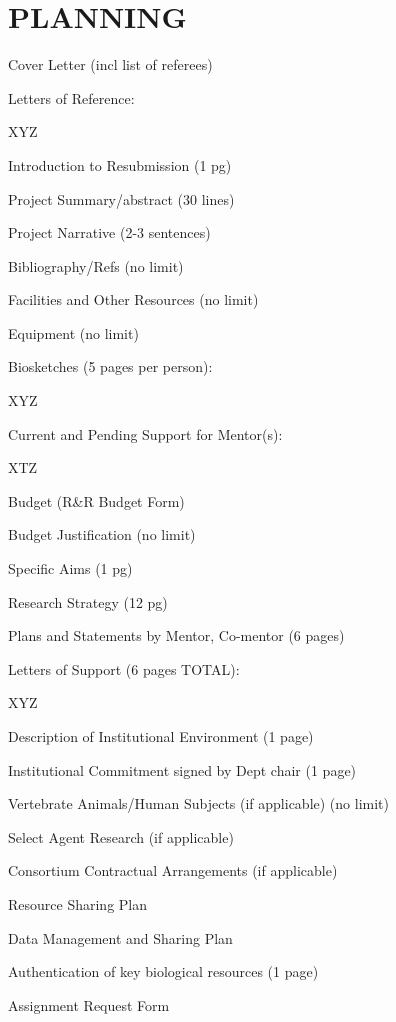 \documentclass[11pt]{article}
\newcommand{\done}{\rlap{$\square$}{\raisebox{2pt}{\large\hspace{1pt}$\checkmark$}}}
\newcommand{\inprogress}{\rlap{$\square$}{\Large\hspace{2pt}$\cdot$}}
\begin{document}

\section*{PLANNING}

\begin{todolist}
  \item[\done] Cover Letter (incl list of referees)
  \item[\done] Letters of Reference:
  \begin{todolist}
    \item[\done] XYZ
  \end{todolist}
  \item[\inprogress] Introduction to Resubmission (1 pg)
  \item Project Summary/abstract (30 lines)
  \item Project Narrative (2-3 sentences)
  \item Bibliography/Refs (no limit)
  \item Facilities and Other Resources (no limit)
  \item Equipment (no limit)
  \item Biosketches (5 pages per person):
  \begin{todolist}
    \item XYZ
  \end{todolist}
  \item Current and Pending Support for Mentor(s):
  \begin{todolist}
    \item XTZ
  \end{todolist}
  \item Budget (R\&R Budget Form)
  \item Budget Justification (no limit)
  \item Specific Aims (1 pg)
  \item Research Strategy (12 pg)
  \item Plans and Statements by Mentor, Co-mentor (6 pages)
  \item Letters of Support (6 pages TOTAL):
  \begin{todolist}
    \item XYZ
  \end{todolist}
  \item Description of Institutional Environment (1 page)
  \item Institutional Commitment signed by Dept chair (1 page)
  \item Vertebrate Animals/Human Subjects (if applicable) (no limit)
  \item Select Agent Research (if applicable)
  \item Consortium Contractual Arrangements (if applicable)
  \item Resource Sharing Plan
  \item Data Management and Sharing Plan
  \item Authentication of key biological resources (1 page)
  \item Assignment Request Form
\end{todolist}
\end{document}
